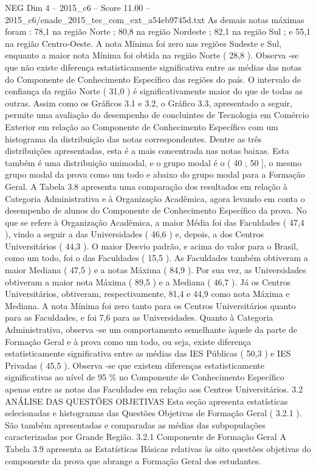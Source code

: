 \begin{textsample}{NEG Dim 4 – 2015\_c6 – Score 11.00 – 2015\_c6/enade\_2015\_tec\_com\_ext\_a54eb9745d.txt}
As demais notas máximas foram : 78,1 na região Norte ; 80,8 na região Nordeste ; 82,1 na região Sul ; e 55,1 na região Centro-Oeste.
A nota Mínima foi zero nas regiões Sudeste e Sul, enquanto a maior nota Mínima foi obtida na região Norte ( 28,8 ).
Observa -se que não existe diferença estatisticamente significativa entre as médias das notas do Componente de Conhecimento Específico das regiões do país.
O intervalo de confiança da região Norte ( 31,0 ) é significativamente maior do que de todas as outras.
Assim como os Gráficos 3.1 e 3.2, o Gráfico 3.3, apresentado a seguir, permite uma avaliação do desempenho de concluintes de Tecnologia em Comércio Exterior em relação ao Componente de Conhecimento Específico com um histograma da distribuição das notas correspondentes.
Dentre as três distribuições apresentadas, esta é a mais concentrada nas notas baixas.
Esta também é uma distribuição unimodal, e o grupo modal é o ( 40 ; 50 ], o mesmo grupo modal da prova como um todo e abaixo do grupo modal para a Formação Geral.
A Tabela 3.8 apresenta uma comparação dos resultados em relação à Categoria Administrativa e à Organização Acadêmica, agora levando em conta o desempenho de alunos do Componente de Conhecimento Específico da prova.
No que se refere à Organização Acadêmica, a maior Média foi das Faculdades ( 47,4 ), vindo a seguir a das Universidades ( 46,6 ) e, depois, a dos Centros Universitários ( 44,3 ).
O maior Desvio padrão, e acima do valor para o Brasil, como um todo, foi o das Faculdades ( 15,5 ).
As Faculdades também obtiveram a maior Mediana ( 47,5 ) e a notas Máxima ( 84,9 ).
Por sua vez, as Universidades obtiveram a maior nota Máxima ( 89,5 ) e a Mediana ( 46,7 ).
Já os Centros Universitários, obtiveram, respectivamente, 81,4 e 44,9 como nota Máxima e Mediana.
A nota Mínima foi zero tanto para os Centros Universitários quanto para as Faculdades, e foi 7,6 para as Universidades.
Quanto à Categoria Administrativa, observa -se um comportamento semelhante àquele da parte de Formação Geral e à prova como um todo, ou seja, existe diferença estatisticamente significativa entre as médias das IES Públicas ( 50,3 ) e IES Privadas ( 45,5 ).
Observa -se que existem diferenças estatisticamente significativas ao nível de 95 \% no Componente de Conhecimento Específico apenas entre as notas das Faculdades em relação aos Centros Universitários. 3.2 ANÁLISE DAS QUESTÕES OBJETIVAS Esta seção apresenta estatísticas selecionadas e histogramas das Questões Objetivas de Formação Geral ( 3.2.1 ).
São também apresentadas e comparadas as médias das subpopulações caracterizadas por Grande Região. 3.2.1 Componente de Formação Geral A Tabela 3.9 apresenta as Estatísticas Básicas relativas às oito questões objetivas do componente da prova que abrange a Formação Geral dos estudantes.

\end{textsample}
